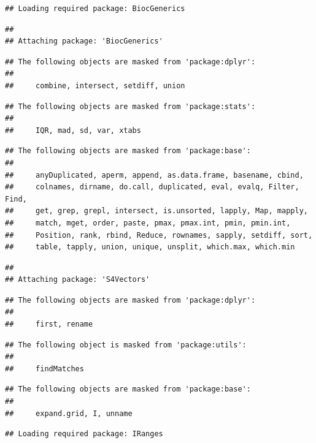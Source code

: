\documentclass[
]{article}
\begin{document}
\begin{verbatim}
## Loading required package: BiocGenerics
\end{verbatim}

\begin{verbatim}
## 
## Attaching package: 'BiocGenerics'
\end{verbatim}

\begin{verbatim}
## The following objects are masked from 'package:dplyr':
## 
##     combine, intersect, setdiff, union
\end{verbatim}

\begin{verbatim}
## The following objects are masked from 'package:stats':
## 
##     IQR, mad, sd, var, xtabs
\end{verbatim}

\begin{verbatim}
## The following objects are masked from 'package:base':
## 
##     anyDuplicated, aperm, append, as.data.frame, basename, cbind,
##     colnames, dirname, do.call, duplicated, eval, evalq, Filter, Find,
##     get, grep, grepl, intersect, is.unsorted, lapply, Map, mapply,
##     match, mget, order, paste, pmax, pmax.int, pmin, pmin.int,
##     Position, rank, rbind, Reduce, rownames, sapply, setdiff, sort,
##     table, tapply, union, unique, unsplit, which.max, which.min
\end{verbatim}

\begin{verbatim}
## 
## Attaching package: 'S4Vectors'
\end{verbatim}

\begin{verbatim}
## The following objects are masked from 'package:dplyr':
## 
##     first, rename
\end{verbatim}

\begin{verbatim}
## The following object is masked from 'package:utils':
## 
##     findMatches
\end{verbatim}

\begin{verbatim}
## The following objects are masked from 'package:base':
## 
##     expand.grid, I, unname
\end{verbatim}

\begin{verbatim}
## Loading required package: IRanges
\end{verbatim}
\end{document}
